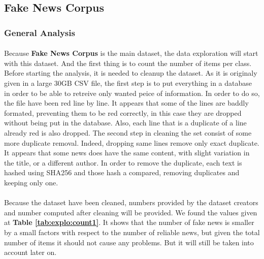 \subsection{Fake News Corpus}
\subsubsection{General Analysis}
\paragraph{} Because \textbf{Fake News Corpus} is the main dataset, the data exploration will start with this dataset. And the first thing is to count the number of items per class. Before starting the analysis, it is needed to cleanup the dataset. As it is originaly given in a large 30GB CSV file, the first step is to put everything in a database in order to be able to retreive only wanted peice of information. In order to do so, the file have been red line by line. It appears that some of the lines are baddly formated, preventing them to be red correctly, in this case they are dropped without being put in the database. Also, each line that is a duplicate of a line already red is also dropped. The second step in cleaning the set consist of some more duplicate removal. Indeed, dropping same lines remove only exact duplicate. It appears that some news does have the same content, with slight variation in the title, or a different author. In order to remove the duplicate, each text is hashed using SHA256 and those hash a compared, removing duplicates and keeping only one. 

\paragraph{} Because the dataset have been cleaned, numbers provided by the dataset creators and number computed after cleaning will be provided. We found the values given at \textbf{Table \ref{tab:explo:count1}}. It shows that the number of fake news is smaller by a small factors with respect to the number of reliable news, but given the total number of items it should not cause any problems. But it will still be taken into account later on. 

